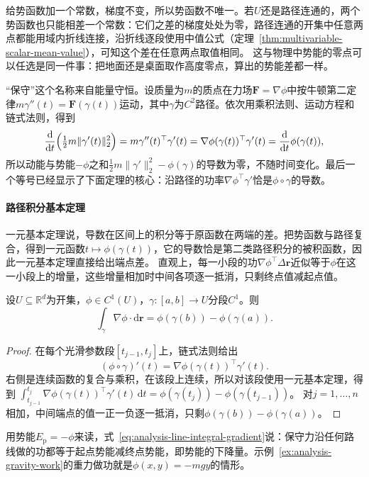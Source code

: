 给势函数加一个常数，梯度不变，所以势函数不唯一。若$U$还是路径连通的，两个势函数也只能相差一个常数：它们之差的梯度处处为零，路径连通的开集中任意两点都能用域内折线连接，沿折线逐段使用中值公式（定理~\ref{thm:multivariable-scalar-mean-value}），可知这个差在任意两点取值相同。
这与物理中势能的零点可以任选是同一件事：把地面还是桌面取作高度零点，算出的势能差都一样。

“保守”这个名称来自能量守恒。设质量为$m$的质点在力场$\bm F=\nabla\phi$中按牛顿第二定律$m\gamma''(t)=\bm F(\gamma(t))$运动，其中$\gamma$为$C^2$路径。依次用乘积法则、运动方程和链式法则，得到
\[
 \frac{\mathrm d}{\mathrm dt}\Bigl(\tfrac12m\lVert\gamma'(t)\rVert_2^2\Bigr)
 =m\gamma''(t)^\top\gamma'(t)=\nabla\phi(\gamma(t))^\top\gamma'(t)
 =\frac{\mathrm d}{\mathrm dt}\phi(\gamma(t)),
\]
所以动能与势能$-\phi$之和$\frac12m\lVert\gamma'\rVert_2^2-\phi(\gamma)$的导数为零，不随时间变化。最后一个等号已经显示了下面定理的核心：沿路径的功率$\nabla\phi^\top\gamma'$恰是$\phi\circ\gamma$的导数。

\paragraph{路径积分基本定理}

一元基本定理说，导数在区间上的积分等于原函数在两端的差。把势函数与路径复合，得到一元函数$t\mapsto\phi(\gamma(t))$，它的导数恰是第二类路径积分的被积函数，因此一元基本定理直接给出端点差。
直观上，每一小段的功$\nabla\phi^\top\Delta\bm r$近似等于$\phi$在这一小段上的增量，这些增量相加时中间各项逐一抵消，只剩终点值减起点值。
\begin{theorem}[路径积分基本定理]
设$U\subseteq\mathbb R^d$为开集，$\phi\in C^1(U)$，$\gamma:[a,b]\to U$分段$C^1$。则
\begin{equation}
  \int_{\gamma}\nabla\phi\mathbin{\cdot}\mathrm{d}\bm{r}
  =\phi(\gamma(b))-\phi(\gamma(a)).
\label{eq:analysis-line-integral-gradient}
\end{equation}
\end{theorem}
\begin{proof}
在每个光滑参数段$[t_{j-1},t_j]$上，链式法则给出
\[
 (\phi\circ\gamma)'(t)=\nabla\phi(\gamma(t))^\top\gamma'(t).
\]
右侧是连续函数的复合与乘积，在该段上连续，所以对该段使用一元基本定理，得到
$\int_{t_{j-1}}^{t_j}\nabla\phi(\gamma(t))^\top\gamma'(t)\,\mathrm dt=\phi(\gamma(t_j))-\phi(\gamma(t_{j-1}))$。
对$j=1,\dots,n$相加，中间端点的值一正一负逐一抵消，只剩$\phi(\gamma(b))-\phi(\gamma(a))$。
\end{proof}

用势能$E_{\mathrm p}=-\phi$来读，式~\eqref{eq:analysis-line-integral-gradient}说：保守力沿任何路线做的功都等于起点势能减终点势能，即势能的下降量。示例~\ref{ex:analysis-gravity-work}的重力做功就是$\phi(x,y)=-mgy$的情形。

